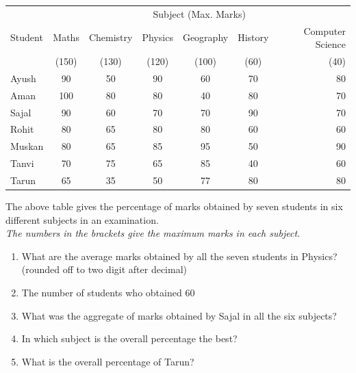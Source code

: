 \documentclass[a4paper]{article}
\begin{document}
\begin{table}[h]
\begin{tabular}{|l|c|c|c|c|c|r|}
\hline
	& \multicolumn{6}{c}{Subject (Max. Marks)} \\
 Student & Maths	 & Chemistry	 & Physics & Geography & History & Computer Science \\

& (150) & (130) & (120) & (100) & (60) & (40) \\
\hline
Ayush	& 90 &	50	& 90	 & 60 & 70  &	80 \\
Aman	 & 100	& 80	 & 80	& 40	 & 80 &	70 \\
Sajal	& 90 &	60 & 	70 & 	70	& 90	 & 70 \\
Rohit	& 80 & 	65 & 	80	& 80	 & 60 &	60 \\
Muskan	& 80 &	65	& 85	 & 95	& 50	 & 90 \\
Tanvi	& 70	 & 75	& 65	 & 85	& 40 &	60 \\
Tarun	& 65 &	35	& 50	 & 77	& 80	 & 80 \\
\hline
\end{tabular}
\end{table}
\noindent The above table gives the percentage of marks obtained by seven students in six different subjects in an examination. \\ 
\textit{The numbers in the brackets give the maximum marks in each subject.}

\begin{enumerate}
\item What are the average marks obtained by all the seven students in Physics? (rounded off to two digit after decimal)
\item The number of students who obtained 60%
\item What was the aggregate of marks obtained by Sajal in all the six subjects?
\item In which subject is the overall percentage the best?
\item What is the overall percentage of Tarun?
\end{enumerate}
\end{document}
